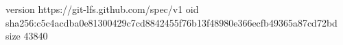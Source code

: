 version https://git-lfs.github.com/spec/v1
oid sha256:c5c4acdba0e81300429c7cd8842455f76b13f48980e366ecfb49365a87cd72bd
size 43840
